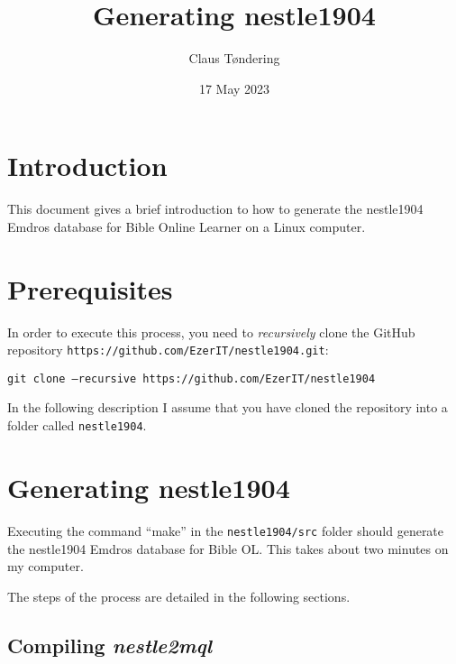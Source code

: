 \documentclass[11pt,oneside,a4paper,article]{memoir}
\title{Generating nestle1904}
\author{Claus Tøndering}
\date{17 May 2023}
\begin{document}
\maketitle


\chapter{Introduction}

This document gives a brief introduction to how to generate the nestle1904 Emdros database for Bible
Online Learner on a Linux computer.

\chapter{Prerequisites}

In order to execute this process, you need to \emph{recursively} clone the GitHub repository
\texttt{https://github.com/EzerIT/nestle1904.git}:

\vspace{1ex}

\quad\texttt{git clone --recursive https://github.com/EzerIT/nestle1904}

\vspace{1ex}

In the following description I assume that you have cloned the repository into a folder called
\texttt{nestle1904}.




\chapter{Generating nestle1904}

Executing the command ``make'' in the \texttt{nestle1904/src} folder should generate the nestle1904
Emdros database for Bible OL. This takes about two minutes on my computer.

The steps of the process are detailed in the following sections.


\section{Compiling \emph{nestle2mql}}
\end{document}
